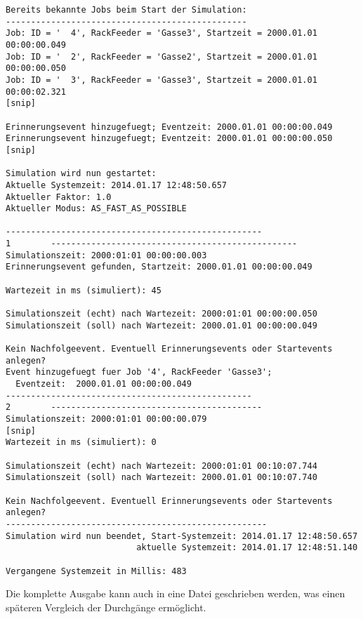 \begin{verbatim}
Bereits bekannte Jobs beim Start der Simulation:
------------------------------------------------
Job: ID = '  4', RackFeeder = 'Gasse3', Startzeit = 2000.01.01 00:00:00.049
Job: ID = '  2', RackFeeder = 'Gasse2', Startzeit = 2000.01.01 00:00:00.050
Job: ID = '  3', RackFeeder = 'Gasse3', Startzeit = 2000.01.01 00:00:02.321
[snip]

Erinnerungsevent hinzugefuegt; Eventzeit: 2000.01.01 00:00:00.049
Erinnerungsevent hinzugefuegt; Eventzeit: 2000.01.01 00:00:00.050
[snip]

Simulation wird nun gestartet:
Aktuelle Systemzeit: 2014.01.17 12:48:50.657
Aktueller Faktor: 1.0
Aktueller Modus: AS_FAST_AS_POSSIBLE

---------------------------------------------------
1        -------------------------------------------------
Simulationszeit: 2000:01:01 00:00:00.003
Erinnerungsevent gefunden, Startzeit: 2000.01.01 00:00:00.049

Wartezeit in ms (simuliert): 45

Simulationszeit (echt) nach Wartezeit: 2000:01:01 00:00:00.050
Simulationszeit (soll) nach Wartezeit: 2000.01.01 00:00:00.049

Kein Nachfolgeevent. Eventuell Erinnerungsevents oder Startevents anlegen?
Event hinzugefuegt fuer Job '4', RackFeeder 'Gasse3'; 
  Eventzeit:  2000.01.01 00:00:00.049
-------------------------------------------------
2        ------------------------------------------
Simulationszeit: 2000:01:01 00:00:00.079
[snip]
Wartezeit in ms (simuliert): 0

Simulationszeit (echt) nach Wartezeit: 2000:01:01 00:10:07.744
Simulationszeit (soll) nach Wartezeit: 2000.01.01 00:10:07.740

Kein Nachfolgeevent. Eventuell Erinnerungsevents oder Startevents anlegen?
----------------------------------------------------
Simulation wird nun beendet, Start-Systemzeit: 2014.01.17 12:48:50.657
                          aktuelle Systemzeit: 2014.01.17 12:48:51.140

Vergangene Systemzeit in Millis: 483
\end{verbatim}
Die komplette Ausgabe kann auch in eine Datei geschrieben werden, was einen späteren Vergleich der Durchgänge ermöglicht.

